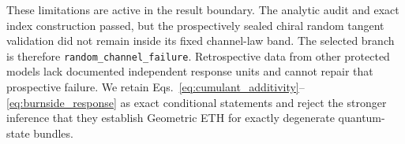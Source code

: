 These limitations are active in the result boundary.  The analytic audit and
exact index construction passed, but the prospectively sealed chiral random
tangent validation did not remain inside its fixed channel-law band.  The
selected branch is therefore \texttt{random\_channel\_failure}.  Retrospective
data from other protected models lack documented independent response units
and cannot repair that prospective failure.  We retain
Eqs.~\eqref{eq:cumulant_additivity}--\eqref{eq:burnside_response} as exact
conditional statements and reject the stronger inference that they establish
Geometric ETH for exactly degenerate quantum-state bundles.
